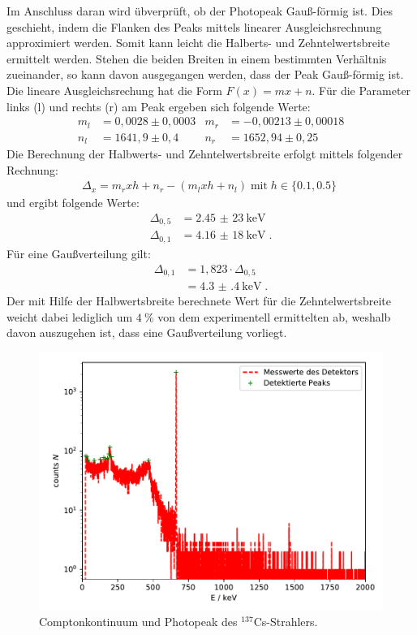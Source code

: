 \noindent Im Anschluss daran wird übverprüft, ob der Photopeak Gauß-förmig ist.
Dies geschieht, indem die Flanken des Peaks mittels linearer Ausgleichsrechnung approximiert werden. Somit kann leicht die Halberts- und Zehntelwertsbreite ermittelt werden. Stehen die beiden Breiten in einem bestimmten Verhältnis zueinander, so kann davon ausgegangen werden, dass der Peak Gauß-förmig ist.
Die lineare Ausgleichsrechung hat die Form $F(x) = m x + n$.
Für die Parameter links (l) und rechts (r) am Peak ergeben sich folgende Werte:
\begin{align*}
    m_l &= 0,0028 \pm 0,0003 & m_r &= -0,00213 \pm 0,00018 \\
    n_l &= 1641,9 \pm 0,4    & n_r &=  1652,94 \pm 0,25
\end{align*}
Die Berechnung der Halbwerts- und Zehntelwertsbreite erfolgt mittels folgender Rechnung:
\begin{align*}
    \Delta_x = m_r x h + n_r - (m_l x h +n_l) \; \text{mit} \; h \in \{0.1, 0.5\} \;
\end{align*}
und ergibt folgende Werte:
\begin{align*}
    \Delta_{0,5} &= \SI{2,45(23)}{\kilo \electronvolt}\\
    \Delta_{0,1} &= \SI{4,16(18)}{\kilo \electronvolt} \; .
\end{align*}
Für eine Gaußverteilung gilt:
\begin{align*}
    \Delta_{0,1} &= 1,823 \cdot \Delta_{0,5} \\
                 &= \SI{4.3(4)}{\kilo \electronvolt} \; .
\end{align*}
Der mit Hilfe der Halbwertsbreite berechnete Wert für die Zehntelwertsbreite weicht dabei lediglich um $\SI{4}{\percent}$ von dem experimentell ermittelten ab, weshalb davon auszugehen ist, dass eine Gaußverteilung vorliegt.
\FloatBarrier
\begin{figure}
    \centering
    \includegraphics[scale=0.7]{Cs_fit.pdf}
    \caption{Comptonkontinuum und Photopeak des $^{137}$Cs-Strahlers.}
    \label{Comptonkontinuum und Photopeak des $^{137}$Cs-Strahlers.$}
\end{figure}
\FloatBarrier

